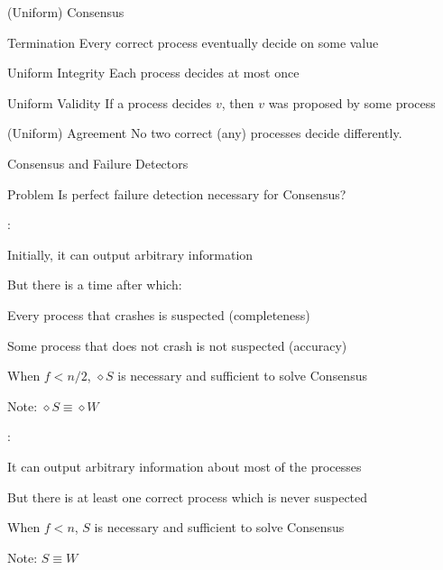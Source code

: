 \begin{frame}{(Uniform) Consensus}

\begin{block}{Termination} Every correct process eventually decide on some value
\end{block}
\begin{block}{Uniform Integrity} Each process decides at most once
\end{block}
\begin{block}{Uniform Validity} If a process decides $v$, then $v$ was proposed by some process
\end{block}
\begin{block}{(Uniform) Agreement} No two correct (any) processes decide differently.
\end{block}
\end{frame}

\begin{frame}{Consensus and Failure Detectors}
	
\begin{block}{Problem}
Is perfect failure detection necessary for Consensus? 
\end{block}

\begin{overprint}

\bigskip
{}:

\BIL
\item Initially, it can output arbitrary information
\item But there is a time after which:
\BI
  \item \alert{Every} process that crashes is suspected (completeness)
  \item \alert{Some} process that does not crash is not suspected (accuracy)
\EI
\item When $f < n/2$, $\diamond S$ is necessary and sufficient to solve Consensus
\item Note: $\diamond S \equiv \diamond W$
\EIL	

\bigskip
{}:

\BIL
\item It can output arbitrary information about most of the processes
\item But there is at least one correct process which is never suspected
\item When $f < n$, $S$ is necessary and sufficient to solve Consensus
\item Note: $S \equiv W$
\EIL	

\end{overprint}

\end{frame}


